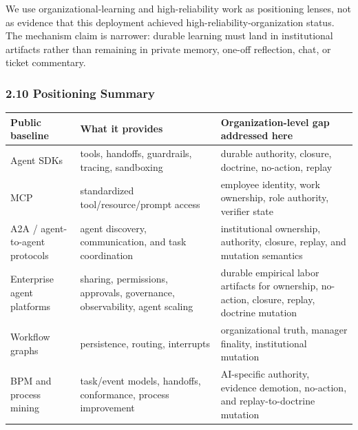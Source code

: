 \documentclass[
]{article}
\newcounter{none} %
\begin{document}
We use organizational-learning and high-reliability work as positioning lenses, not as evidence that this deployment achieved high-reliability-organization status. The mechanism claim is narrower: durable learning must land in institutional artifacts rather than remaining in private memory, one-off reflection, chat, or ticket commentary.

\subsubsection{2.10 Positioning Summary}\label{positioning-summary}

{\def\LTcaptype{none} %
\begin{longtable}[]{@{}
  >{\raggedright\arraybackslash}p{}
  >{\raggedright\arraybackslash}p{}
  >{\raggedright\arraybackslash}p{}@{}}
\toprule\noalign{}
\begin{minipage}[b]{\linewidth}\raggedright
Public baseline
\end{minipage} & \begin{minipage}[b]{\linewidth}\raggedright
What it provides
\end{minipage} & \begin{minipage}[b]{\linewidth}\raggedright
Organization-level gap addressed here
\end{minipage} \\
\midrule\noalign{}
\endhead
\bottomrule\noalign{}
\endlastfoot
Agent SDKs & tools, handoffs, guardrails, tracing, sandboxing & durable authority, closure, doctrine, no-action, replay \\
MCP & standardized tool/resource/prompt access & employee identity, work ownership, role authority, verifier state \\
A2A / agent-to-agent protocols & agent discovery, communication, and task coordination & institutional ownership, authority, closure, replay, and mutation semantics \\
Enterprise agent platforms & sharing, permissions, approvals, governance, observability, agent scaling & durable empirical labor artifacts for ownership, no-action, closure, replay, doctrine mutation \\
Workflow graphs & persistence, routing, interrupts & organizational truth, manager finality, institutional mutation \\
BPM and process mining & task/event models, handoffs, conformance, process improvement & AI-specific authority, evidence demotion, no-action, and replay-to-doctrine mutation \\

\end{longtable}}
\end{document}
